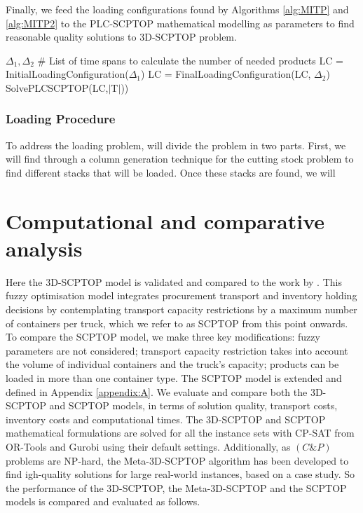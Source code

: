Finally, we feed the loading configurations found by Algorithms \ref{alg:MITP} and \ref{alg:MITP2} to the PLC-SCPTOP mathematical modelling as parameters to find reasonable quality solutions to 3D-SCPTOP problem.

\begin{algorithm}
  \caption{MathH-3D-SCPTOP}
  \begin{algorithmic}[1]
    \State $\Delta_1, \Delta_2$ \# List of time spans to calculate the number of needed products
    \State LC = InitialLoadingConfiguration($\Delta_1$)
    \State LC = FinalLoadingConfiguration(LC, $\Delta_2$)
    \State SolvePLCSCPTOP(LC,$|$T$|$))
  \end{algorithmic}
\end{algorithm}

\subsubsection{Loading Procedure}

To address the loading problem, will divide the problem in two parts. First, we will find through a column generation technique for the cutting stock problem to find different stacks that will be loaded. Once these stacks are found, we will

\section{Computational and comparative analysis}
Here the 3D-SCPTOP model is validated and compared to the work by \autocite{Diaz-Madronero2014APlanning}.  This fuzzy optimisation model integrates procurement transport and inventory holding decisions by contemplating transport capacity restrictions by a maximum number of containers per truck, which we refer to as SCPTOP from this point onwards. To compare the SCPTOP model, we make three key modifications: fuzzy parameters are not considered; transport capacity restriction takes into account the volume of individual containers and the truck’s capacity; products can be loaded in more than one container type. The SCPTOP model is extended and defined in Appendix \ref{appendix:A}.
We evaluate and compare both the 3D-SCPTOP and SCPTOP models, in terms of solution quality, transport costs, inventory costs and computational times. The 3D-SCPTOP and SCPTOP mathematical formulations are solved for all the instance sets with CP-SAT from OR-Tools and Gurobi using their default settings. Additionally, as $(C\& P)$ problems are NP-hard, the Meta-3D-SCPTOP algorithm has been developed to find igh-quality solutions for large real-world instances, based on a case study. So the performance of the 3D-SCPTOP, the Meta-3D-SCPTOP and the SCPTOP models is compared and evaluated as follows.


